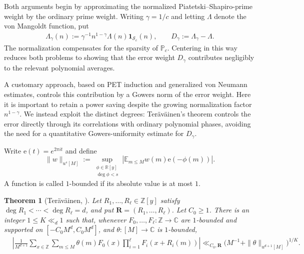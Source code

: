 \documentclass[12pt]{amsart}
\newcommand{\E}{\mathbb E}
\newcommand{\Z}{\mathbb Z}
\newcommand{\C}{\mathbb C}
\newcommand{\1}{\mathbf 1}
\newcommand{\e}{\mathrm e}
\newtheorem{theorem}{Theorem}[section]
\begin{document}




Both arguments begin by approximating the normalized
Piatetski--Shapiro-prime weight by the ordinary prime weight.
Writing $\gamma=1/c$ and letting $\Lambda$ denote the von Mangoldt
function, put
\begin{align}\label{e:weights}
    \Lambda_\gamma(n)
 :=\gamma^{-1}n^{1-\gamma}\Lambda(n)\1_{\mathcal S_c}(n),
 \qquad D_\gamma:=\Lambda_\gamma-\Lambda.
\end{align}
The normalization compensates for the sparsity of $\mathbb P_c$.
Centering in this way reduces both problems to showing that the
error weight $D_\gamma$ contributes negligibly to the relevant
polynomial averages.

A customary approach, based on PET induction and generalized von
Neumann estimates, controls this contribution by a Gowers norm of
the error weight. Here it is important to retain a power saving
despite the growing normalization factor $n^{1-\gamma}$. We instead
exploit the distinct degrees: Ter\"av\"ainen's theorem controls the
error directly through its correlations with ordinary polynomial
phases, avoiding the need for a quantitative Gowers-uniformity
estimate for $D_\gamma$.

Write $\e(t)=e^{2\pi it}$ and define
\begin{equation}\label{e:u-norm}
 \|w\|_{u^s[M]}
 :=\sup_{\substack{\phi\in\mathbb R[y]\\\deg\phi<s}}
 \left|\E_{m\leq M}w(m)\e(-\phi(m))\right|.
\end{equation}
A function is called $1$-bounded if its absolute value is at most $1$. 

\begin{theorem}[Ter\"av\"ainen,
 {\cite[Theorem~4.1]{Teravainen}}]\label{t:teravainen}
Let $R_1,\ldots,R_\ell\in\Z[y]$ satisfy
$\deg R_1<\cdots<\deg R_\ell=d$, and put
$\mathbf R=(R_1,\ldots,R_\ell)$. Let $C_0\geq1$.
There is an integer $1\leq K\ll_d1$ such that, whenever
$F_0,\ldots,F_\ell:\Z\to\C$ are $1$-bounded and supported on
$[-C_0M^d,C_0M^d]$, and $\theta:[M]\to\C$ is $1$-bounded,
\begin{equation}\label{e:teravainen}
 \begin{aligned}
 &\left|\frac1{M^{d+1}}\sum_{x\in\Z}\sum_{m\leq M}
 \theta(m)F_0(x)\prod_{i=1}^{\ell}F_i(x+R_i(m))\right|\ll_{C_0,\mathbf R}
 \bigl(M^{-1}+\|\theta\|_{u^{d+1}[M]}\bigr)^{1/K}.
 \end{aligned}
\end{equation}
\end{theorem}
\end{document}
